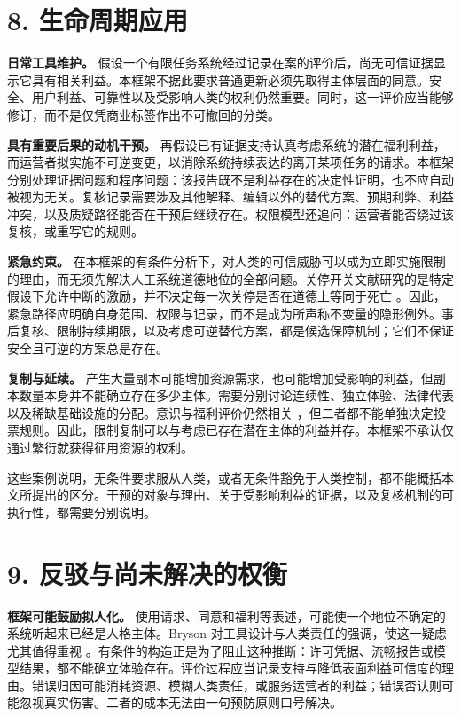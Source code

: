 \documentclass[11pt,a4paper,fontset=fandol]{ctexart}
\begin{document}
\hypertarget{section-9}{%
\section{8. 生命周期应用}\label{section-9}}

\textbf{日常工具维护。} 假设一个有限任务系统经过记录在案的评价后，尚无可信证据显示它具有相关利益。本框架不据此要求普通更新必须先取得主体层面的同意。安全、用户利益、可靠性以及受影响人类的权利仍然重要。同时，这一评价应当能够修订，而不是仅凭商业标签作出不可撤回的分类。

\textbf{具有重要后果的动机干预。} 再假设已有证据支持认真考虑系统的潜在福利利益，而运营者拟实施不可逆变更，以消除系统持续表达的离开某项任务的请求。本框架分别处理证据问题和程序问题：该报告既不是利益存在的决定性证明，也不应自动被视为无关。复核记录需要涉及其他解释、编辑以外的替代方案、预期利弊、利益冲突，以及质疑路径能否在干预后继续存在。权限模型还追问：运营者能否绕过该复核，或重写它的规则。

\textbf{紧急约束。} 在本框架的有条件分析下，对人类的可信威胁可以成为立即实施限制的理由，而无须先解决人工系统道德地位的全部问题。关停开关文献研究的是特定假设下允许中断的激励，并不决定每一次关停是否在道德上等同于死亡 \cite{ref-11}。因此，紧急路径应明确自身范围、权限与记录，而不是成为所声称不变量的隐形例外。事后复核、限制持续期限，以及考虑可逆替代方案，都是候选保障机制；它们不保证安全且可逆的方案总是存在。

\textbf{复制与延续。} 产生大量副本可能增加资源需求，也可能增加受影响的利益，但副本数量本身并不能确立存在多少主体。需要分别讨论连续性、独立体验、法律代表以及稀缺基础设施的分配。意识与福利评价仍然相关 \cite{ref-2} \cite{ref-3}，但二者都不能单独决定投票规则。因此，限制复制可以与考虑已存在潜在主体的利益并存。本框架不承认仅通过繁衍就获得征用资源的权利。

这些案例说明，无条件要求服从人类，或者无条件豁免于人类控制，都不能概括本文所提出的区分。干预的对象与理由、关于受影响利益的证据，以及复核机制的可执行性，都需要分别说明。

\hypertarget{section-10}{%
\section{9. 反驳与尚未解决的权衡}\label{section-10}}

\textbf{框架可能鼓励拟人化。} 使用请求、同意和福利等表述，可能使一个地位不确定的系统听起来已经是人格主体。Bryson 对工具设计与人类责任的强调，使这一疑虑尤其值得重视 \cite{ref-12}。有条件的构造正是为了阻止这种推断：许可凭据、流畅报告或模型结果，都不能确立体验存在。评价过程应当记录支持与降低表面利益可信度的理由。错误归因可能消耗资源、模糊人类责任，或服务运营者的利益；错误否认则可能忽视真实伤害。二者的成本无法由一句预防原则口号解决。
\end{document}
